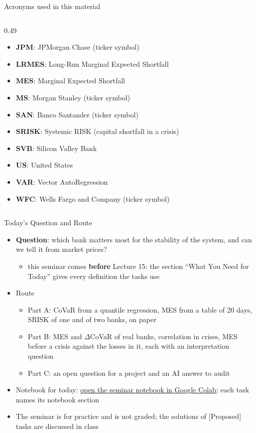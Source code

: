 \begin{frame}{Acronyms used in this material}
\begin{columns}[T]
\begin{column}{0.49\textwidth}
\begin{itemize}
    \item \textbf{JPM}: JPMorgan Chase (ticker symbol)
    \item \textbf{LRMES}: Long-Run Marginal Expected Shortfall
    \item \textbf{MES}: Marginal Expected Shortfall
    \item \textbf{MS}: Morgan Stanley (ticker symbol)
    \item \textbf{SAN}: Banco Santander (ticker symbol)
    \item \textbf{SRISK}: Systemic RISK (capital shortfall in a crisis)
    \item \textbf{SVB}: Silicon Valley Bank
    \item \textbf{US}: United States
    \item \textbf{VAR}: Vector AutoRegression
    \item \textbf{WFC}: Wells Fargo and Company (ticker symbol)
\end{itemize}
\end{column}
\end{columns}
\end{frame}

\begin{frame}{Today's Question and Route}
\itemsize{\small}
\begin{itemize}
    \item \textbf{Question}: which bank matters most for the stability of the system, and can we tell it from market prices?
    \begin{itemize}
        \item this seminar comes \textbf{before} Lecture 15: the section ``What You Need for Today'' gives every definition the tasks use
    \end{itemize}
    \item Route
    \begin{itemize}
        \item Part A: CoVaR from a quantile regression, MES from a table of 20 days, SRISK of one and of two banks, on paper
        \item Part B: MES and $\Delta$CoVaR of real banks, correlation in crises, MES before a crisis against the losses in it, each with an interpretation question
        \item Part C: an open question for a project and an AI answer to audit
    \end{itemize}
    \item Notebook for today: \href{\nb}{open the seminar notebook in Google Colab}; each task names its notebook section
    \item The seminar is for practice and is not graded; the solutions of [Proposed] tasks are discussed in class
\end{itemize}
\end{frame}

